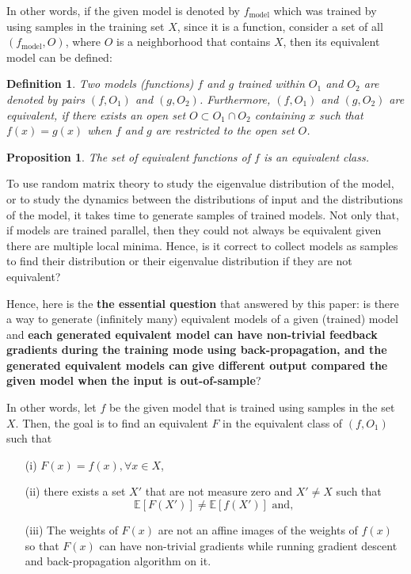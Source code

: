 \documentclass{article}
\theoremstyle{plain}
\theoremstyle{plain} %
\newtheorem{proposition}{Proposition}
\newtheorem{definition}[theorem]{Definition}
\theoremstyle{definition}  %
\theoremstyle{remark}  %
\theoremstyle{plain}
\begin{document}
In other words, if the given model is denoted by $f_{\text{model}}$ which was trained by using samples in the training set $X$, since it is a function, consider a set of all $(f_{\text{model}},O)$, where $O$ is a neighborhood that contains $X$, then its equivalent model can be defined:
\begin{definition}
Two models (functions) $f$ and $g$ trained within $O_1$ and $O_2$ are denoted by pairs $(f,O_1)$ and $(g,O_2)$. Furthermore, $(f,O_1)$ and $(g,O_2)$ are equivalent, if there exists an open set $O\subset O_1 \cap O_2$ containing $x$ such that $f(x)=g(x)$ when $f$ and $g$ are restricted to the open set $O$.
\end{definition}
\begin{proposition}\cite{tu2011manifolds}
The set of equivalent functions of $f$ is an equivalent class.
\end{proposition}


To use random matrix theory to study the eigenvalue distribution of the model, or to study the dynamics between the distributions of input and the distributions of the model, it takes time to generate samples of trained models. Not only that, if models are trained parallel, then they could not always be equivalent given there are multiple local minima. Hence, is it correct to collect models as samples to find their distribution or their eigenvalue distribution if they are not equivalent?

Hence, here is the \textbf{the essential question} that answered by this paper: is there a way to generate (infinitely many) equivalent models of a given (trained) model and \textbf{each generated equivalent model can have non-trivial feedback gradients during the training mode using back-propagation, and the generated equivalent models can give different output compared the given model when the input is out-of-sample}?

In other words, let $f$ be the given model that is trained using samples in the set $X$. Then, the goal is to find an equivalent $F$ in the equivalent class of $(f,O_1)$ such that
\begin{itemize}
\item[(i)] $F(x)=f(x), \forall x\in X$, 
\item[(ii)] there exists a set $X'$ that are not measure zero and $X'\neq X$ such that 
$$\mathbb{E} \left[ F(X') \right] \neq \mathbb{E} \left[ f(X') \right] \text{ and, }$$
\item[(iii)] The weights of $F(x)$ are not an affine images of the weights of $f(x)$ so that $F(x)$ can have non-trivial gradients while running gradient descent and back-propagation algorithm on it.
\end{itemize}
\end{document}
